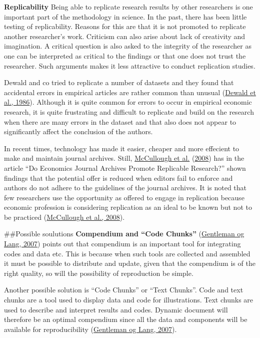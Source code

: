 \documentclass[
  12pt,
  norsk,
]{article}
\begin{document}
\textbf{Replicability} Being able to replicate research results by other
researchers is one important part of the methodology in science. In the
past, there has been little testing of replicability. Reasons for this
are that it is not promoted to replicate another researcher's work.
Criticism can also arise about lack of creativity and imagination. A
critical question is also asked to the integrity of the researcher as
one can be interpreted as critical to the findings or that one does not
trust the researcher. Such arguments makes it less attractive to conduct
replication studies.

Dewald and co tried to replicate a number of datasets and they found
that accidental errors in empirical articles are rather common than
unusual (\protect\hyperlink{ref-dewald1986}{Dewald et al., 1986}).
Although it is quite common for errors to occur in empirical economic
research, it is quite frustrating and difficult to replicate and build
on the research when there are many errors in the dataset and that also
does not appear to significantly affect the conclusion of the authors.

In recent times, technology has made it easier, cheaper and more
effecient to make and maintain journal archives. Still,
\protect\hyperlink{ref-mccullough2008}{McCullough et al.}
(\protect\hyperlink{ref-mccullough2008}{2008}) has in the article ``Do
Economics Journal Archives Promote Replicable Research?'' shown findings
that the potential offer is reduced when editors fail to enforce and
authors do not adhere to the guidelines of the journal archives. It is
noted that few researchers use the opportunity as offered to engage in
replication because economic profession is considering replication as an
ideal to be known but not to be practiced
(\protect\hyperlink{ref-mccullough2008}{McCullough et al., 2008}).

\#\#Possible soulutions \textbf{Compendium and ``Code Chunks''}
(\protect\hyperlink{ref-gentleman2007}{Gentleman og Lang, 2007}) points
out that compendium is an important tool for integrating codes and data
etc. This is because when such tools are collected and assembled it must
be possible to distribute and update, given that the compendium is of
the right quality, so will the possibility of reproduction be simple.

Another possible solution is ``Code Chunks'' or ``Text Chunks''. Code
and text chunks are a tool used to display data and code for
illustrations. Text chunks are used to describe and interpret results
and codes. Dynamic document will therefore be an optimal compendium
since all the data and components will be available for reproducibility
(\protect\hyperlink{ref-gentleman2007}{Gentleman og Lang, 2007}).
\end{document}
